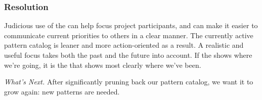 \subsubsection*{Resolution} 
Judicious use of the  can help focus project participants, and can make it easier to communicate current priorities to others in a clear manner.  The currently active pattern catalog is leaner and more action-oriented as a result.
%
A realistic and useful focus takes both the past and the future into account.  If the 
shows where we're going, it is the  that shows most clearly where we've been.

\begin{framed}
\emph{What's Next.}
After significantly pruning back our pattern catalog, we want it to grow again: new patterns are needed.
\end{framed}


